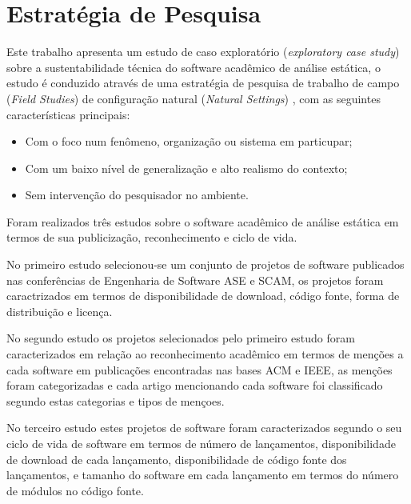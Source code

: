 \section{Estratégia de Pesquisa}

Este trabalho apresenta um estudo de caso exploratório ({\it exploratory case
study}) sobre a sustentabilidade técnica do software acadêmico de análise
estática, o estudo é conduzido através de uma estratégia de pesquisa de
trabalho de campo ({\it Field Studies}) de configuração natural ({\it Natural
Settings}) \cite{stol2015holistic}, com as seguintes características
principais:

\begin{itemize}
  \item Com o foco num fenômeno, organização ou sistema em particupar;
  \item Com um baixo nível de generalização e alto realismo do contexto;
  \item Sem intervenção do pesquisador no ambiente.
\end{itemize}


Foram realizados três estudos sobre o software acadêmico de análise estática em
termos de sua publicização, reconhecimento e ciclo de vida.

No primeiro estudo selecionou-se um conjunto de projetos de software publicados
nas conferências de Engenharia de Software ASE e SCAM, os projetos foram
caractrizados em termos de disponibilidade de download, código fonte, forma de
distribuição e licença.

No segundo estudo os projetos selecionados pelo primeiro estudo foram
caracterizados em relação ao reconhecimento acadêmico em termos de menções a
cada software em publicações encontradas nas bases ACM e IEEE, as menções foram
categorizadas e cada artigo mencionando cada software foi classificado segundo
estas categorias e tipos de mençoes.

No terceiro estudo estes projetos de software foram caracterizados segundo o
seu ciclo de vida de software em termos de número de lançamentos,
disponibilidade de download de cada lançamento, disponibilidade de código fonte
dos lançamentos, e tamanho do software em cada lançamento em termos do número
de módulos no código fonte.


